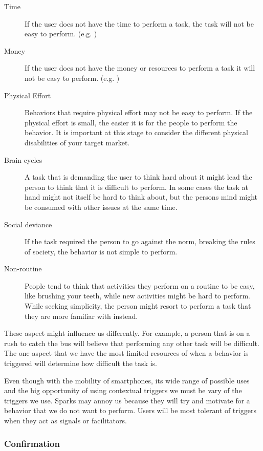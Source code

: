 \begin{description}
  \item[Time] If the user does not have the time to perform a task, the task will not be easy to perform. (e.g. )
  \item[Money] If the user does not have the money or resources to perform a task it will not be easy to perform. (e.g. )
  \item[Physical Effort] Behaviors that require physical effort may not be easy to perform. If the physical effort is small, the easier it is for the people to perform the behavior. It is important at this stage to consider the different physical disabilities of your target market.
  \item[Brain cycles] A task that is demanding the user to think hard about it might lead the person to think that it is difficult to perform. In some cases the task at hand might not itself be hard to think about, but the persons mind might be consumed with other issues at the same time.
  \item[Social deviance] If the task required the person to go against the norm, breaking the rules of society, the behavior is not simple to perform.
  \item[Non-routine] People tend to think that activities they perform on a routine to be easy, like brushing your teeth, while new activities might be hard to perform. While seeking simplicity, the person might resort to perform a task that they are more familiar with instead.
\end{description}

These aspect might influence us differently. For example, a person that is on a rush to catch the bus will believe that performing any other task will be difficult. The one aspect that we have the most limited resources of when a behavior is triggered will determine how difficult the task is.

Even though with the mobility of smartphones, its wide range of possible uses and the big opportunity of using contextual triggers we must be vary of the triggers we use. Sparks may annoy us because they will try and motivate for a behavior that we do not want to perform. Users will be most tolerant of triggers when they act as signals or facilitators.

\subsubsection{Confirmation}

